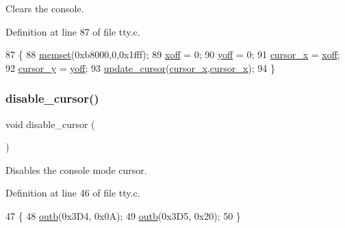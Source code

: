 Clears the console. 



Definition at line 87 of file tty.\+c.


\begin{DoxyCode}
87                    \{
88     \hyperlink{a00131_a9e432f267691eceb2e2e0efcc37efbc9_a9e432f267691eceb2e2e0efcc37efbc9}{memset}(0xb8000,0,0x1fff);
89     \hyperlink{a00179_abaa0d20f0e52ce0d3a7d706f6ac16266_abaa0d20f0e52ce0d3a7d706f6ac16266}{xoff} = 0;
90     \hyperlink{a00179_a1a7539764d0ae8cd06ce45c62cf92bca_a1a7539764d0ae8cd06ce45c62cf92bca}{yoff} = 0;
91     \hyperlink{a00179_ae69604af0f9bd5fca2a016d0aa1ba7e1_ae69604af0f9bd5fca2a016d0aa1ba7e1}{cursor\_x} = \hyperlink{a00179_abaa0d20f0e52ce0d3a7d706f6ac16266_abaa0d20f0e52ce0d3a7d706f6ac16266}{xoff};
92     \hyperlink{a00179_a0301c5492919c401c2c1ecf52af709b0_a0301c5492919c401c2c1ecf52af709b0}{cursor\_y} = \hyperlink{a00179_a1a7539764d0ae8cd06ce45c62cf92bca_a1a7539764d0ae8cd06ce45c62cf92bca}{yoff};
93     \hyperlink{a00179_a492f5021d7340613e732ef37bbaa04e4_a492f5021d7340613e732ef37bbaa04e4}{update\_cursor}(\hyperlink{a00179_ae69604af0f9bd5fca2a016d0aa1ba7e1_ae69604af0f9bd5fca2a016d0aa1ba7e1}{cursor\_x},\hyperlink{a00179_ae69604af0f9bd5fca2a016d0aa1ba7e1_ae69604af0f9bd5fca2a016d0aa1ba7e1}{cursor\_x});
94 \}
\end{DoxyCode}
\mbox{\label{a00179_a3d09038c7b6436e60b228f2f3f451f6a_a3d09038c7b6436e60b228f2f3f451f6a}} 
\subsubsection{\texorpdfstring{disable\+\_\+cursor()}{disable\_cursor()}}
{\footnotesize\ttfamily void disable\+\_\+cursor (\begin{DoxyParamCaption}{ }\end{DoxyParamCaption})}



Disables the console mode cursor. 



Definition at line 46 of file tty.\+c.


\begin{DoxyCode}
47 \{
48     \hyperlink{a00164_aa37f5841c54156a4b14fc0d6f626b44f_aa37f5841c54156a4b14fc0d6f626b44f}{outb}(0x3D4, 0x0A);
49     \hyperlink{a00164_aa37f5841c54156a4b14fc0d6f626b44f_aa37f5841c54156a4b14fc0d6f626b44f}{outb}(0x3D5, 0x20);
50 \}
\end{DoxyCode}
\mbox{\label{a00179_acb9a978008cfa67b0038e85eb56d2d41_acb9a978008cfa67b0038e85eb56d2d41}} 

